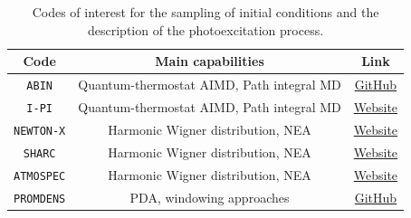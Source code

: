 \documentclass[9pt,bestpractices,pubversion]{livecoms}
\begin{document}
\begin{table}[h!]
    \centering
    \begin{tabular}{|c|c|c|}
    \hline 
    \textbf{Code}  & \textbf{Main capabilities} & \textbf{Link} \\ 
    \hline
      \texttt{ABIN}   & Quantum-thermostat AIMD, Path integral MD & \href{https://github.com/PHOTOX/ABIN}{GitHub} \\
        \texttt{I-PI}   & Quantum-thermostat AIMD, Path integral MD & \href{https://ipi-code.org}{Website} \\
      \texttt{NEWTON-X} & Harmonic Wigner distribution, NEA  & \href{https://newtonx.org}{Website} \\
      \texttt{SHARC}   & Harmonic Wigner distribution, NEA & \href{https://sharc-md.org}{Website}\\
    \texttt{ATMOSPEC}   & Harmonic Wigner distribution, NEA & \href{https://github.com/ispg-group/aiidalab-ispg}{Website}\\
    \texttt{PROMDENS}   & PDA, windowing approaches & \href{https://github.com/PHOTOX/promdens}{GitHub}\\
    \hline
    \end{tabular}
    \caption{Codes of interest for the sampling of initial conditions and the description of the photoexcitation process.}
    \label{tab:IC}
\end{table}
\end{document}
